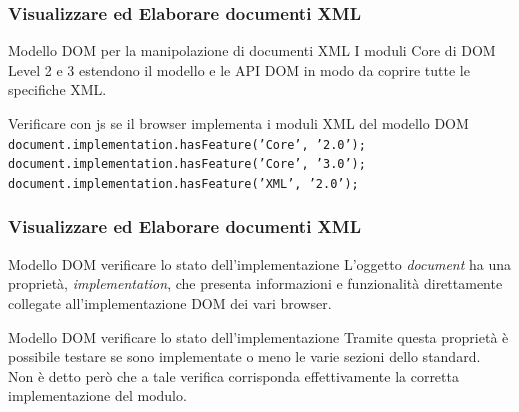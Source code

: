 \begin{frame}
    \frametitle{Visualizzare ed Elaborare documenti XML}
    \addtocounter{nframe}{1}
   
     \begin{block}{Modello DOM per la manipolazione di documenti XML}
        I moduli Core di DOM Level 2 e 3 estendono il modello e le API DOM in modo da coprire tutte le specifiche XML.
     \end{block}

     \begin{block}{Verificare con js se il browser implementa i moduli XML del modello DOM}
        \texttt{document.implementation.hasFeature('Core', '2.0'); }
        \\\texttt{document.implementation.hasFeature('Core', '3.0');} 
        \\\texttt{document.implementation.hasFeature('XML', '2.0');}
     \end{block}
     
\end{frame}

\begin{frame}
    \frametitle{Visualizzare ed Elaborare documenti XML}
    \addtocounter{nframe}{1}
    

     \begin{block}{Modello DOM verificare lo stato dell'implementazione}
        L'oggetto \textit{document} ha una proprietà, \textit{implementation}, che presenta informazioni e funzionalità direttamente collegate all'implementazione DOM dei vari browser.
     \end{block}

     \begin{block}{Modello DOM verificare lo stato dell'implementazione}
        Tramite questa proprietà è possibile testare se sono implementate o meno le varie sezioni dello standard. 
        \\ Non è detto però che a tale verifica corrisponda effettivamente la corretta implementazione del modulo.
     \end{block}
     
\end{frame}


